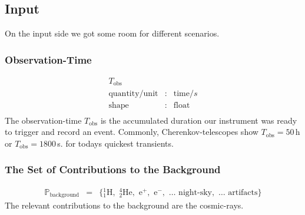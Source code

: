 \documentclass{article}%
\begin{document}
        \subsection{Input}
            On the input side we got some room for different scenarios.
        \subsubsection*{Observation-Time}
            \begin{eqnarray*}
                T_\text{obs} && \\
                \text{quantity}/\text{unit} &:& \text{time} / s\\
                \text{shape} &:& \text{float}\\
            \end{eqnarray*}
            The observation-time $T_\text{obs}$ is the accumulated duration our instrument was ready to trigger and record an event.
            Commonly, Cherenkov-telescopes show $T_\text{obs} = 50\,$h or $T_\text{obs} = 1800\,$s. for todays quickest transients.
        \subsubsection*{The Set of Contributions to the Background}
            \begin{eqnarray*}
                \mathbb{P}_\text{background} &=& \{
                {_1^1}\text{H},\,\,
                {_2^4}\text{He},\,\,
                \text{e}^{+},\,\,
                \text{e}^{-},\,\,
                \dots{}\,\,
                \text{night-sky},\,\,
                \dots{}\,\,
                \text{artifacts}
                \}
            \end{eqnarray*}
            The relevant contributions to the background are the cosmic-rays.
\end{document}
